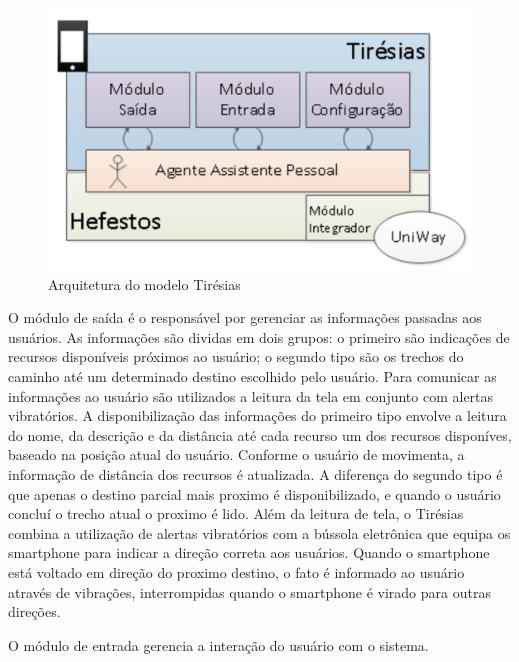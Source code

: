 \documentclass[english,brazilian]{UNISINOSmonografia}
\begin{document}
	\FloatBarrier
	\begin{figure}[!ht]
		\caption{Arquitetura do modelo Tirésias}
		\label{fig:visaoGeral}
		\centering%
		\begin{minipage}{.6\textwidth}
			\includegraphics[width=\textwidth]{tiresiasArquitetura}
		\end{minipage}
	\end{figure}
	\FloatBarrier

	O módulo de saída é o responsável por gerenciar as informações passadas aos usuários. As informações são dividas em dois grupos: o primeiro são indicações de recursos disponíveis próximos ao usuário; o segundo tipo são os trechos do caminho até um determinado destino escolhido pelo usuário. Para comunicar as informações ao usuário são utilizados a leitura da tela em conjunto com alertas vibratórios. A disponibilização das informações do primeiro tipo envolve a leitura do nome, da descrição e da distância até cada recurso um dos recursos disponíves, baseado na posição atual do usuário. Conforme o usuário de movimenta, a informação de distância dos recursos é atualizada. A diferença do segundo tipo é que apenas o destino parcial mais proximo é disponibilizado, e quando o usuário concluí o trecho atual o proximo é lido. Além da leitura de tela, o Tirésias combina a utilização de alertas vibratórios com a bússola eletrônica que equipa os smartphone para indicar a direção correta aos usuários. Quando o smartphone está voltado em direção do proximo destino, o fato é informado ao usuário através de vibrações, interrompidas quando o smartphone é virado para outras direções.

	O módulo de entrada gerencia a interação do usuário com o sistema. 
\end{document}
